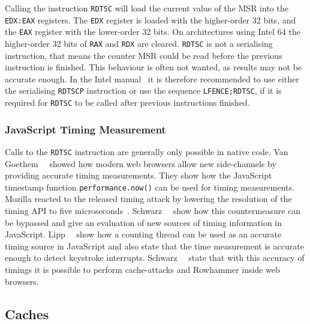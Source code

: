 Calling the instruction \texttt{RDTSC} will load the current value of the MSR
into the \texttt{EDX:EAX} registers. The \texttt{EDX} register is loaded with
the higher-order 32 bits, and the \texttt{EAX} register with the lower-order 32
bits. On architectures using Intel 64 the higher-order 32 bits of \texttt{RAX}
and \texttt{RDX} are cleared. \texttt{RDTSC} is not a serialising instruction,
that means the counter MSR could be read before the previous instruction is
finished. This behaviour is often not wanted, as results may not be accurate
enough. In the Intel manual~\cite{intelsys} it is therefore recommended to use
either the serialising \texttt{RDTSCP} instruction or use the sequence
\texttt{LFENCE;RDTSC}, if it is required for \texttt{RDTSC} to be called after
previous instructions finished.

\subsubsection{JavaScript Timing Measurement}

Calls to the \texttt{RDTSC} instruction are generally only possible in native
code. Van Goethem~\etal~\cite{webtime} showed how modern web browsers allow new
side-channels by providing accurate timing measurements. They show how the
JavaScript timestamp function \texttt{performance.now()} can be used for timing
measurements. Mozilla reacted to the released timing attack by lowering the
resolution of the timing API to five microseconds~\cite{moztime}.
Schwarz~\etal~\cite{fantastictimers} show how this countermeasure can be
bypassed and give an evaluation of new sources of timing information in
JavaScript. Lipp~\etal~\cite{armageddon, keytimejs} show how a counting thread
can be used as an accurate timing source in JavaScript and also state that the
time measurement is accurate enough to detect keystroke interrupts.
Schwarz~\etal~\cite{fantastictimers} state that with this accuracy of timings it
is possible to perform cache-attacks and Rowhammer inside web browsers.

\subsection{Caches}

